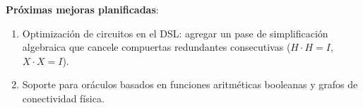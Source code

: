 \documentclass[11pt,a4paper]{article}
\begin{document}
\textbf{Próximas mejoras planificadas}:
\begin{enumerate}
    \item Optimización de circuitos en el DSL: agregar un pase de simplificación algebraica que cancele compuertas redundantes consecutivas ($H \cdot H = I$, $X \cdot X = I$).
    \item Soporte para oráculos basados en funciones aritméticas booleanas y grafos de conectividad física.
\end{enumerate}
\end{document}
